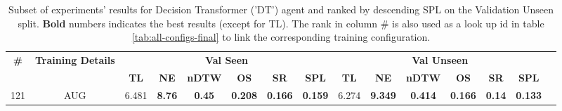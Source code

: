 \begin{table}
\centering
\caption{\label{tab:dt_env_drop}Subset of experiments' results for Decision Transformer ('DT') agent and ranked by descending SPL on the Validation Unseen split. \textbf{Bold} numbers indicates the best results (except for TL). The rank in column \# is also used as a look up id in table \ref{tab:all-configs-final} to link the corresponding training configuration.}
\begin{tabular}{@{\hskip3pt}c@{\hskip3pt}c@{\hskip3pt}c@{\hskip3pt}c@{\hskip3pt}c@{\hskip3pt}c@{\hskip3pt}c@{\hskip3pt}c@{\hskip3pt}c@{\hskip3pt}c@{\hskip3pt}c@{\hskip3pt}c@{\hskip3pt}c@{\hskip3pt}c@{\hskip3pt}c}
\toprule
                                  \textbf{\#} & \textbf{Training Details} & \multicolumn{6}{c}{\textbf{Val Seen}} & \multicolumn{6}{c}{\textbf{Val Unseen}} \\
\cmidrule(l){3-8}\cmidrule(l){9-14}\textbf{~} &                \textbf{~} &       \textbf{TL} &    \textbf{NE} &  \textbf{nDTW} &     \textbf{OS} &     \textbf{SR} &    \textbf{SPL} &         \textbf{TL} &     \textbf{NE} &   \textbf{nDTW} &     \textbf{OS} &    \textbf{SR} &    \textbf{SPL} \\
\midrule
                                          121 &                       AUG &             6.481 &  \textbf{8.76} &  \textbf{0.45} &  \textbf{0.208} &  \textbf{0.166} &  \textbf{0.159} &               6.274 &  \textbf{9.349} &  \textbf{0.414} &  \textbf{0.166} &  \textbf{0.14} &  \textbf{0.133} \\
\bottomrule
\end{tabular}
\end{table}
